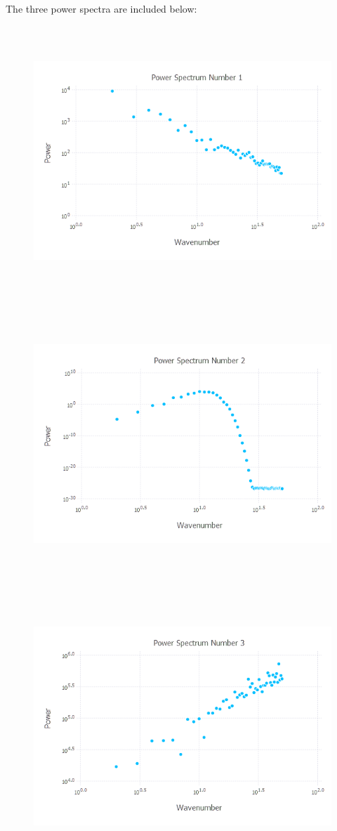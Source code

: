 \documentclass{article}
\begin{document}
The three power spectra are included below:
\begin{figure}[H]
	\includegraphics[width=6in,height=4in]{"ps1"}
\end{figure}
\begin{figure}[H]
	\includegraphics[width=6in,height=4in]{"ps2"}
\end{figure}
\begin{figure}[H]
	\includegraphics[width=6in,height=4in]{"ps3"}
\end{figure}
\end{document}
